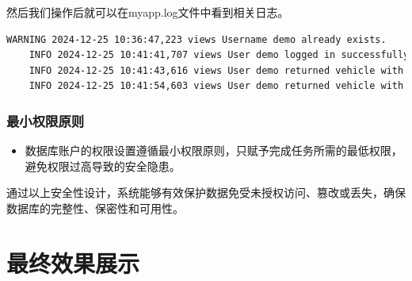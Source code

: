 \documentclass[UTF8,a4paper,12pt]{ctexart}
\begin{document}
然后我们操作后就可以在myapp.log文件中看到相关日志。

\begin{lstlisting}[language=bash]
    WARNING 2024-12-25 10:36:47,223 views Username demo already exists.
    INFO 2024-12-25 10:41:41,707 views User demo logged in successfully.
    INFO 2024-12-25 10:41:43,616 views User demo returned vehicle with ID XPENG001.
    INFO 2024-12-25 10:41:54,603 views User demo returned vehicle with ID XPENG001.
\end{lstlisting}

\subsubsection{最小权限原则}
\begin{itemize}
    \item 数据库账户的权限设置遵循最小权限原则，只赋予完成任务所需的最低权限，避免权限过高导致的安全隐患。
\end{itemize}

通过以上安全性设计，系统能够有效保护数据免受未授权访问、篡改或丢失，确保数据库的完整性、保密性和可用性。

\section{最终效果展示}
\end{document}
